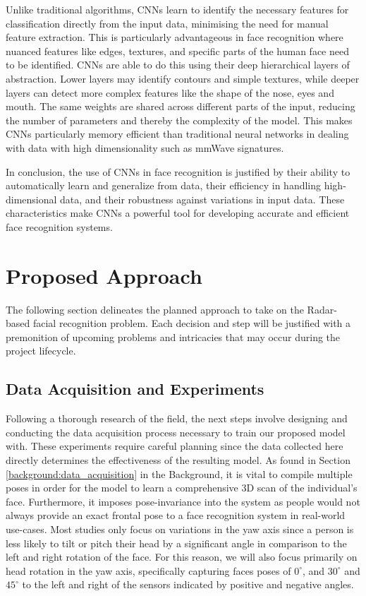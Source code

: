 \documentclass{interim}
\begin{document}
Unlike traditional algorithms, CNNs learn to identify the necessary features for classification directly from the input data, minimising the need for manual feature extraction. This is particularly advantageous in face recognition where nuanced features like edges, textures, and specific parts of the human face need to be identified. CNNs are able to do this using their deep hierarchical layers of abstraction. Lower layers may identify contours and simple textures, while deeper layers can detect more complex features like the shape of the nose, eyes and mouth. The same weights are shared across different parts of the input, reducing the number of parameters and thereby the complexity of the model. This makes CNNs particularly memory efficient than traditional neural networks in dealing with data with high dimensionality such as mmWave signatures.

In conclusion, the use of CNNs in face recognition is justified by their ability to automatically learn and generalize from data, their efficiency in handling high-dimensional data, and their robustness against variations in input data. These characteristics make CNNs a powerful tool for developing accurate and efficient face recognition systems.


\newpage
\section{Proposed Approach}
The following section delineates the planned approach to take on the Radar-based facial recognition problem. Each decision and step will be justified with a premonition of upcoming problems and intricacies that may occur during the project lifecycle.

\subsection{Data Acquisition and Experiments}
\label{approach:data_acquisition}
Following a thorough research of the field, the next steps involve designing and conducting the data acquisition process necessary to train our proposed model with. These experiments require careful planning since the data collected here directly determines the effectiveness of the resulting model. As found in Section \ref{background:data_acquisition} in the Background, it is vital to compile multiple poses in order for the model to learn a comprehensive 3D scan of the individual's face. Furthermore, it imposes pose-invariance into the system as people would not always provide an exact frontal pose to a face recognition system in real-world use-cases. Most studies only focus on variations in the yaw axis since a person is less likely to tilt or pitch their head by a significant angle in comparison to the left and right rotation of the face. For this reason, we will also focus primarily on head rotation in the yaw axis, specifically capturing faces poses of $0^\circ$, and $30^\circ$ and $45^\circ$ to the left and right of the sensors indicated by positive and negative angles. 
\end{document}
